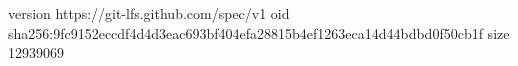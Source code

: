 version https://git-lfs.github.com/spec/v1
oid sha256:9fc9152eccdf4d4d3eac693bf404efa28815b4ef1263eca14d44bdbd0f50cb1f
size 12939069
